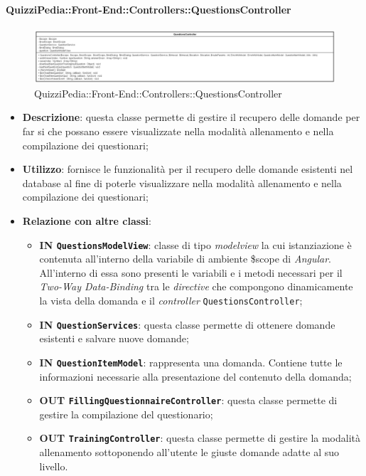 \paragraph{QuizziPedia::Front-End::Controllers::QuestionsController}
\begin{figure} [ht]
	\centering
	\includegraphics[scale=0.45]{UML/Classi/Front-End/QuizziPedia_Front-end_Controller_QuestionsController.png}
	\caption{QuizziPedia::Front-End::Controllers::QuestionsController}
\end{figure} \FloatBarrier
\begin{itemize}
	\item \textbf{Descrizione}: questa classe permette di gestire il recupero delle domande per far si che possano essere visualizzate nella modalità allenamento e nella compilazione dei questionari;
	\item \textbf{Utilizzo}: fornisce le funzionalità per il recupero delle domande esistenti nel database al fine di poterle visualizzare nella modalità allenamento e nella compilazione dei questionari;
	\item \textbf{Relazione con altre classi}:
	\begin{itemize}
		\item \textbf{IN \texttt{QuestionsModelView}}: classe di tipo \textit{modelview} la cui istanziazione è contenuta all'interno della variabile di ambiente \$scope di \textit{Angular}. All'interno di essa sono presenti le variabili e i metodi necessari per il \textit{Two-Way Data-Binding} tra le \textit{directive} che compongono dinamicamente la vista della domanda e il \textit{controller} \texttt{QuestionsController};
		\item \textbf{IN \texttt{QuestionServices}}: questa classe permette di ottenere domande esistenti e salvare nuove domande;
		\item \textbf{IN \texttt{QuestionItemModel}}: rappresenta una domanda. Contiene tutte le informazioni necessarie alla presentazione del contenuto della domanda;
		\item \textbf{OUT \texttt{FillingQuestionnaireController}}: questa classe permette di gestire la compilazione del questionario;
		\item \textbf{OUT \texttt{TrainingController}}: questa classe permette di gestire la modalità allenamento sottoponendo all'utente le giuste domande adatte al suo livello.

\end{itemize}
\end{itemize}
